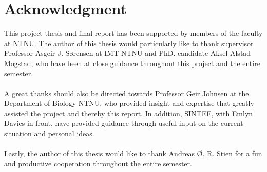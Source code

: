 \chapter*{Acknowledgment}
This project thesis and final report has been supported by members of the faculty at NTNU. The author of this thesis would particularly like to thank supervisor Professor Asgeir J. S{\o}rensen at IMT NTNU and PhD. candidate Aksel Alstad Mogstad, who have been at close guidance throughout this project and the entire semester. 
\\\\
A great thanks should also be directed towards Professor Geir Johnsen at the Department of Biology NTNU, who provided insight and expertise that greatly assisted the project and thereby this report. In addition, SINTEF, with Emlyn Davies in front, have provided guidance through useful input on the current situation and personal ideas.  
\\\\
Lastly, the author of this thesis would like to thank Andreas {\O}. R. Stien for a fun and productive cooperation throughout the entire semester. 
